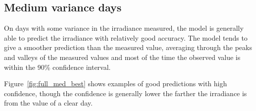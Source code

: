 \subsection{Medium variance days}
On days with some variance in the irradiance measured, the model is generally able to predict the irradiance with relatively good accuracy.
The model tends to give a smoother prediction than the measured value, averaging through the peaks and valleys of the measured values and most of the time the observed value is within the 90\% confidence interval. 

Figure~\ref{fig:full_med_best} shows examples of good predictions with high confidence, though the confidence is generally lower the farther the irradiance is from the value of a clear day.


